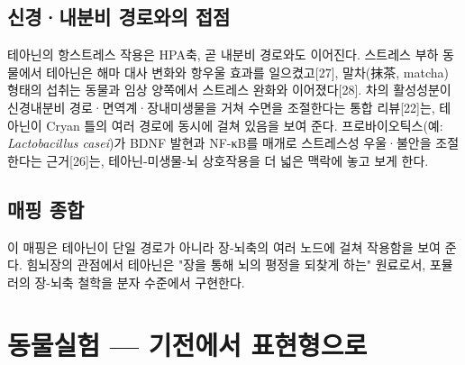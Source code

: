 \documentclass[12pt,oneside]{book}
\begin{document}
\subsection{신경·내분비 경로와의 접점}

테아닌의 항스트레스 작용은 HPA축, 곧 내분비 경로와도 이어진다. 스트레스 부하 동물에서 테아닌은 해마 대사 변화와 항우울 효과를 일으켰고[27], 말차(抹茶, matcha) 형태의 섭취는 동물과 임상 양쪽에서 스트레스 완화와 이어졌다[28]. 차의 활성성분이 신경내분비 경로·면역계·장내미생물을 거쳐 수면을 조절한다는 통합 리뷰[22]는, 테아닌이 Cryan 틀의 여러 경로에 동시에 걸쳐 있음을 보여 준다. 프로바이오틱스(예: \textit{Lactobacillus casei})가 BDNF 발현과 NF-κB를 매개로 스트레스성 우울·불안을 조절한다는 근거[26]는, 테아닌-미생물-뇌 상호작용을 더 넓은 맥락에 놓고 보게 한다.

\subsection{매핑 종합}

\vspace{2pt}\vspace{3pt}

이 매핑은 테아닌이 단일 경로가 아니라 장-뇌축의 여러 노드에 걸쳐 작용함을 보여 준다. 힘뇌장의 관점에서 테아닌은 "장을 통해 뇌의 평정을 되찾게 하는" 원료로서, 포뮬러의 장-뇌축 철학을 분자 수준에서 구현한다.

\section{동물실험 — 기전에서 표현형으로}
\end{document}
